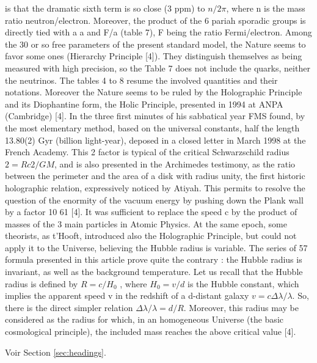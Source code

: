 \documentclass[a4paper,9pt]{article}
\begin{document}
is that the dramatic sixth term is so close (3 ppm) to $n/2\pi$, where n is the mass ratio
neutron/electron.
Moreover, the product of the 6 pariah sporadic groups is directly tied with a a and F/a (table 7), F
being the ratio Fermi/electron. Among the 30 or so free parameters of the present standard model,
the Nature seems to favor some ones (Hierarchy Principle [4]). They distinguish themselves as
being measured with high precision, so the Table 7 does not include the quarks, neither the neutrinos. The tables 4 to 8 resume the involved quantities and their notations. Moreover the Nature
seems to be ruled by the Holographic Principle and its Diophantine form, the Holic Principle,
presented in 1994 at ANPA (Cambridge) [4]. In the three first minutes of his sabbatical year FMS
found, by the most elementary method, based on the universal constants, half the length 13.80(2)
Gyr (billion light-year), deposed in a closed letter in March 1998 at the French Academy.
This 2 factor is typical of the critical Schwarzschild radius $2 = Rc 2 /GM$, and is also presented in
the Archimedes testimony, as the ratio between the perimeter and the area of a disk with radius
unity, the first historic holographic relation, expressively noticed by Atiyah. This permits to resolve
the question of the enormity of the vacuum energy by pushing down the Plank wall by a factor 10 61
[4]. It was sufficient to replace the speed c by the product of masses of the 3 main particles in
Atomic Physics. At the same epoch, some theorists, as t'Hooft, introduced also the Holographic
Principle, but could not apply it to the Universe, believing the Hubble radius is variable.
The series of 57 formula presented in this article prove quite the contrary : the Hubble radius is
invariant, as well as the background temperature. Let us recall that the Hubble radius is defined by
$R = c/H_0$ , where $H_0 = v/d$ is the Hubble constant, which implies the apparent speed v in the redshift
of a d-distant galaxy $v = c \Delta\lambda/\lambda$. So, there is the direct simpler relation $\Delta\lambda/\lambda = d/R$. Moreover, this
radius may be considered as the radius for which, in an homogeneous Universe (the basic
cosmological principle), the included mass reaches the above critical value [4].

Voir Section \ref{sec:headings}.
\end{document}
